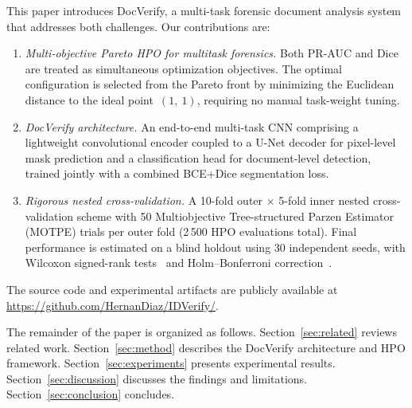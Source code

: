 This paper introduces DocVerify, a multi-task forensic document
analysis system that addresses both challenges. Our contributions are:

\begin{enumerate}
  \item \textit{Multi-objective Pareto HPO for multitask forensics.}
    Both PR-AUC and Dice are treated as simultaneous optimization objectives.
    The optimal configuration is selected from the Pareto front by minimizing
    the Euclidean distance to the ideal point~$(1,~1)$, requiring no manual
    task-weight tuning.

  \item \textit{DocVerify architecture.}
    An end-to-end multi-task CNN comprising a lightweight convolutional encoder
    coupled to a U-Net decoder for pixel-level mask prediction and a
    classification head for document-level detection, trained jointly with a
    combined BCE+Dice segmentation loss.

  \item \textit{Rigorous nested cross-validation.}
    A 10-fold outer $\times$ 5-fold inner nested cross-validation scheme with
    50 Multiobjective Tree-structured Parzen Estimator (MOTPE) trials per
    outer fold (2\,500 HPO evaluations total). Final performance is estimated
    on a blind holdout using 30 independent seeds, with Wilcoxon signed-rank
    tests~\citep{wilcoxon1945} and Holm--Bonferroni correction~\citep{holm1979}.
\end{enumerate}

The source code and experimental artifacts are publicly available at
\url{https://github.com/HernanDiaz/IDVerify/}.

The remainder of the paper is organized as follows. Section~\ref{sec:related}
reviews related work. Section~\ref{sec:method} describes the DocVerify
architecture and HPO framework. Section~\ref{sec:experiments} presents
experimental results. Section~\ref{sec:discussion} discusses the findings and
limitations. Section~\ref{sec:conclusion} concludes.
